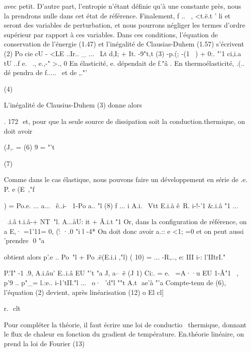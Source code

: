 {{{{{{{{{{{{{{{{avec petit. D'autre part, l'entropie n'étant définie qu'à une constante près, nous la prendrons nulle dans cet état de référence. Finalement, f .. ~, <t.ë.t ' li et ~ seront des variables de perturbation, et nous pourrons né­gliger les termes d'ordre supérieur par rapport à ces variables. 
Dans ces conditions, l'équation de conservation de l'énergie (1.47) et l'inégalité de Clausias-Duhem (1.57) s'écrivent 
(2)  Po  cie cU  - <LE ..Ir.. _ ...~ Lt d,I;  + It.  -9"t,t  
(3)  -p.(;  -(1  ~)  +  0:. "'1  ci,i.a tU  ..f e.  ~.,  e.,-"  >.,  0  
En élasticité,  e.  dépendait de  f."â  . En thermoélasticité,  .(..  dé­ 
pendra de  f.....~  et de  ,."'\  

(4) 


L'inégalité de Clausius-Duhem (3) donne alors 

. 172 ­
et, pour que la seule source de dissipation soit la conduction.thermique, on doit avoir 

(J,. =
(6) 
9 = 
"'t 

(7) 


Comme dans le cas élastique, nous pouvons faire un développement en série de .e. 
P. e (E~,"f}) = Po.e. ... a...~ ê..i-~ 1-Po a.. "l
(8) 
f 	... i A.i.~ Vtt E.i.à ê~R. i-!-'1 &.i.â "1 ... 


~.i.â t.i.â-+ NT\, "l. A...àU: it + Â.i.t "1 
Or, dans la configuration de référence, on a E,· =1'11= 0, (\': ·.0
"i l -4* 
On doit donc avoir a.:: e <1; =0 et on peut aussi 'prendre
 0 
"a

obtient alors 
p'.e .. Po~"l + Po .ë(E.i.i ,"l)
( 10) 
= ... -R,.., e: III i-: l'II\. trI."

P.'I" -1 	.9, A.i.âu' E..i.â EU "'t "a J, a--~ë 
(J 1) Ci:. = e. ~=A··u EU 1-Â"1~ , p'9 .. p"_= l.:e.. i-1'tII."l 
...~ 	o·  'd"l ""t A.t
 ae'à "'a 
Compte-tenu de (6), l'équation (2) devient, après linéarisation 
(12) 	
o El cl] 

r. 
 clt 



Pour compléter la théorie, il faut écrire une loi de conductio~ thermique, donnant le flux de chaleur en fonction du gradient de température. En.théorie linéaire, on prend la loi de Fourier 
(13) 


}}}}}}}}}}}}}}}
